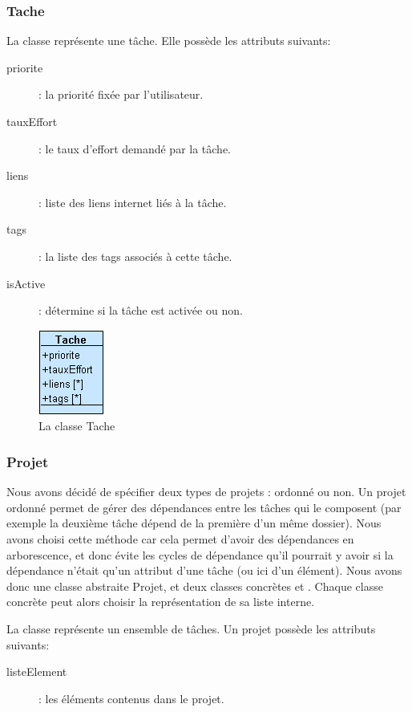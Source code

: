 \subsubsection{Tache}

	La classe  représente une tâche. Elle possède les attributs suivants:
	\begin{description}
		\item[priorite]: la priorité fixée par l'utilisateur.
		\item[tauxEffort]: le taux d'effort demandé par la tâche.
		\item[liens]: liste des liens internet liés à la tâche.
		\item[tags]: la liste des tags associés à cette tâche.
		\item[isActive]: détermine si la tâche est activée ou non.
	\end{description}

\begin{figure}[htbp]
	\centering
		\includegraphics[scale=1]{images/L3/structureDonnee/tache.png}
	\caption{La classe Tache}
	\label{fig:tache}
\end{figure}

\subsubsection{Projet}

Nous avons décidé de spécifier deux types de projets : ordonné ou non.
Un projet ordonné permet de gérer des dépendances entre les tâches qui le composent (par exemple la deuxième tâche dépend de la première d'un même dossier).
Nous avons choisi cette méthode car cela permet d'avoir des dépendances en arborescence, et donc évite les cycles de dépendance qu'il pourrait y avoir si la dépendance n'était qu'un attribut d'une tâche (ou ici d'un élément).
Nous avons donc une classe abstraite Projet, et deux classes concrètes  et .
Chaque classe concrète peut alors choisir la représentation de sa liste interne.

	La classe  représente un ensemble de tâches. Un projet possède les attributs suivants:
	\begin{description}
		\item[listeElement]: les éléments contenus dans  le projet.
	\end{description}

